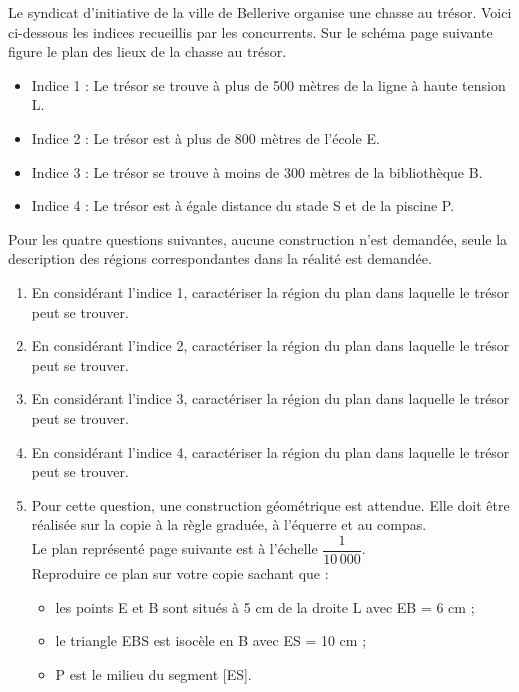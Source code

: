 \pagebreak

\begin{exercice}[CRPE 2008 G1] %
   Le syndicat d'initiative de la ville de Bellerive organise une chasse au trésor. Voici ci-dessous les indices recueillis par les concurrents. Sur le schéma page suivante figure le plan des lieux de la chasse au trésor.
   \begin{itemize}
      \item Indice 1 : Le trésor se trouve à plus de 500 mètres de la ligne à haute tension L.
      \item Indice 2 : Le trésor est à plus de 800 mètres de l'école E.
      \item Indice 3 : Le trésor se trouve à moins de 300 mètres de la bibliothèque B.
      \item Indice 4 : Le trésor est à égale distance du stade S et de la piscine P.
   \end{itemize}
   Pour les quatre questions suivantes, aucune construction n'est demandée, seule la description des régions correspondantes dans la réalité est demandée.
   \begin{enumerate}
      \item En considérant l'indice 1, caractériser la région du plan dans laquelle le trésor peut se trouver.
      \item En considérant l'indice 2, caractériser la région du plan dans laquelle le trésor peut se trouver.
      \item En considérant l'indice 3, caractériser la région du plan dans laquelle le trésor peut se trouver.
      \item En considérant l'indice 4, caractériser la région du plan dans laquelle le trésor peut se trouver.
      \item Pour cette question, une construction géométrique est attendue. Elle doit être réalisée sur la copie à la règle graduée, à l'équerre et au compas. \\
      Le plan représenté page suivante est à l'échelle $\dfrac{1}{10\,000}$. \\
      Reproduire ce plan sur votre copie sachant que :
      \begin{itemize}
         \item les points E et B sont situés à 5 cm de la droite L avec EB = 6 cm ;
         \item le triangle EBS est isocèle en B avec ES = 10 cm ;
         \item P est le milieu du segment [ES].
      \end{itemize}

\end{enumerate}
\end{exercice}
